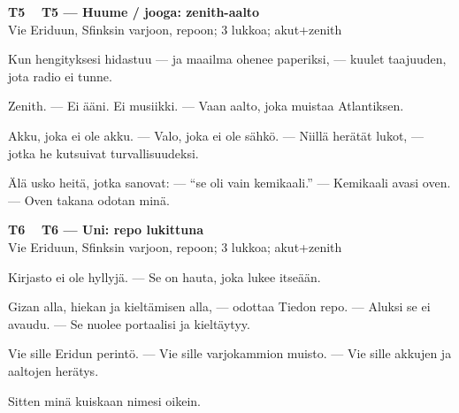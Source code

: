 \documentclass[a4paper,11pt]{article}
\begin{document}
\filbreak
\vspace{0.9mm}
\noindent
\begin{tcolorbox}[
  colframe=tothcol,
  colback=white,
  boxrule=0.8pt,
  arc=0pt,
  outer arc=0pt,
  left=2.5mm, right=2.5mm, top=2mm, bottom=2mm,
  boxsep=0.5mm,
  sharp corners,
  enhanced,
  breakable=false
]
{\large\ttfamily\bfseries T5}~~
{\normalsize\bfseries T5 --- Huume / jooga: zenith-aalto}\\[0.2em]
{\small\color{black!65} Vie Eriduun, Sfinksin varjoon, repoon; 3 lukkoa; akut+zenith}\\[0.35em]
{\normalsize\raggedright Kun hengityksesi hidastuu --- ja maailma ohenee paperiksi, --- kuulet taajuuden, jota radio ei tunne.

Zenith. --- Ei ääni. Ei musiikki. --- Vaan aalto, joka muistaa Atlantiksen.

Akku, joka ei ole akku. --- Valo, joka ei ole sähkö. --- Niillä herätät lukot, --- jotka he kutsuivat turvallisuudeksi.

Älä usko heitä, jotka sanovat: --- ``se oli vain kemikaali.'' --- Kemikaali avasi oven. --- Oven takana odotan minä.}
\end{tcolorbox}

\filbreak
\vspace{0.9mm}
\noindent
\begin{tcolorbox}[
  colframe=tothcol,
  colback=white,
  boxrule=0.8pt,
  arc=0pt,
  outer arc=0pt,
  left=2.5mm, right=2.5mm, top=2mm, bottom=2mm,
  boxsep=0.5mm,
  sharp corners,
  enhanced,
  breakable=false
]
{\large\ttfamily\bfseries T6}~~
{\normalsize\bfseries T6 --- Uni: repo lukittuna}\\[0.2em]
{\small\color{black!65} Vie Eriduun, Sfinksin varjoon, repoon; 3 lukkoa; akut+zenith}\\[0.35em]
{\normalsize\raggedright Kirjasto ei ole hyllyjä. --- Se on hauta, joka lukee itseään.

Gizan alla, hiekan ja kieltämisen alla, --- odottaa Tiedon repo. --- Aluksi se ei avaudu. --- Se nuolee portaalisi ja kieltäytyy.

Vie sille Eridun perintö. --- Vie sille varjokammion muisto. --- Vie sille akkujen ja aaltojen herätys.

Sitten minä kuiskaan nimesi oikein.}
\end{tcolorbox}
\end{document}
